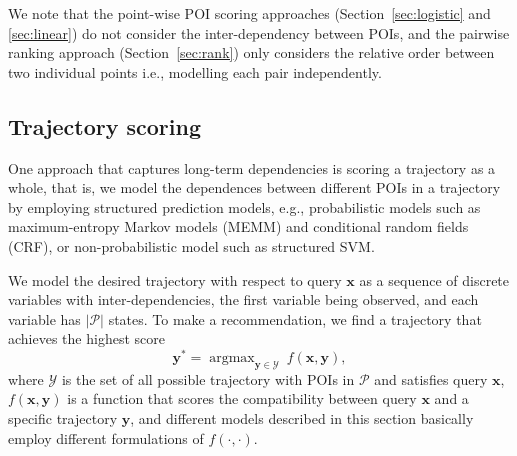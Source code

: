 \documentclass[9pt]{extarticle}
\DeclareMathOperator*{\argmax}{argmax}
\begin{document}
We note that the point-wise POI scoring approaches (Section~\ref{sec:logistic} and \ref{sec:linear}) do not consider the inter-dependency between POIs,
and the pairwise ranking approach (Section~\ref{sec:rank}) only considers the relative order between two individual points 
i.e., modelling each pair independently.



\subsection{Trajectory scoring}
\label{sec:structured}

One approach that captures long-term dependencies is scoring a trajectory as a whole,
that is, we model the dependences between different POIs in a trajectory by employing structured prediction models,
e.g., probabilistic models such as maximum-entropy Markov models (MEMM) and conditional random fields (CRF),
or non-probabilistic model such as structured SVM.

We model the desired trajectory with respect to query $\mathbf{x}$ as a sequence of discrete variables with inter-dependencies,
the first variable being observed, and each variable has $|\mathcal{P}|$ states.
To make a recommendation, we find a trajectory that achieves the highest score
\begin{equation*}
\mathbf{y}^* = \argmax_{\mathbf{y} \in \mathcal{Y}}~ f(\mathbf{x}, \mathbf{y}),
\end{equation*}
where $\mathcal{Y}$ is the set of all possible trajectory with POIs in $\mathcal{P}$ and satisfies query $\mathbf{x}$,
$f(\mathbf{x}, \mathbf{y})$ is a function that scores the compatibility between query $\mathbf{x}$ and a specific trajectory $\mathbf{y}$,
and different models described in this section basically employ different formulations of $f(\cdot,\cdot)$. %
\end{document}
